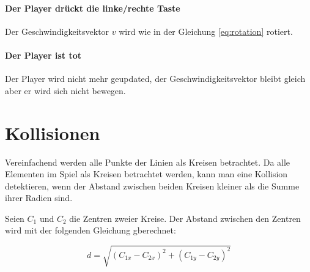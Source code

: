 \documentclass[doktyp=studarbeit]{TUBAFarbeiten}
\begin{document}
\paragraph{Der Player drückt die linke/rechte Taste}
Der Geschwindigkeitsvektor $v$ wird wie in der Gleichung \ref{eq:rotation}
rotiert.

\paragraph{Der Player ist tot}
Der Player wird nicht mehr geupdated, der Geschwindigkeitsvektor bleibt gleich
aber er wird sich nicht bewegen.

\section{Kollisionen}

Vereinfachend werden alle Punkte der Linien als Kreisen betrachtet.
Da alle Elementen im Spiel als Kreisen betrachtet werden, kann man eine Kollision
detektieren, wenn der Abstand zwischen beiden Kreisen kleiner als die Summe ihrer Radien sind.

Seien $C_{1}$ und $C_{2}$ die Zentren zweier Kreise. Der Abstand zwischen den 
Zentren wird mit der folgenden Gleichung gberechnet:

\begin{equation}
    d = \sqrt{(C_{1x} - C_{2x})^2 + (C_{1y} - C_{2y})^2}
\end{equation}
\end{document}
